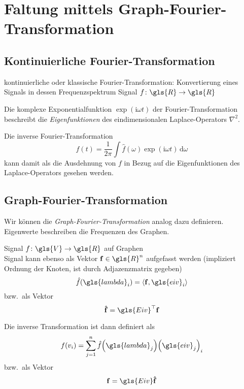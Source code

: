\section{Faltung mittels Graph-Fourier-Transformation}

\subsection{Kontinuierliche Fourier-Transformation}

kontinuierliche oder klassische Fourier-Transformation:
Konvertierung eines Signals in dessen Frequenzspektrum
Signal $f \colon \gls{R} \to \gls{R}$

Die komplexe Exponentialfunktion $\exp\left(\mathrm{i}\omega t\right)$ der Fourier-Transformation beschreibt die \emph{Eigenfunktionen} des eindimensionalen Laplace-Operators $\nabla^2$.

Die inverse Fourier-Transformation
\begin{equation}
  f\left(t\right) = \frac{1}{2\pi} \int \hat f\left(\omega\right) \exp\left(\mathrm{i}\omega t\right)\,\mathrm{d}\omega
\end{equation}
kann damit als die Ausdehnung von $f$ in Bezug auf die Eigenfunktionen des Laplace-Operators gesehen werden.

\subsection{Graph-Fourier-Transformation}

Wir können die \emph{Graph-Fourier-Transformation} analog dazu definieren.\\
Eigenwerte beschreiben die Frequenzen des Graphen.

Signal $f \colon \gls{V} \to \gls{R}$ auf Graphen\\
Signal kann ebenso als Vektor $\ve{f} \in \gls{R}^n$ aufgefasst werden (impliziert Ordnung der Knoten, ist durch Adjazenzmatrix gegeben)\\
\begin{equation}
  \hat f(\gls{lambda}_i) = \left\langle \ve{f}, \gls{eiv}_i \right\rangle
\end{equation}
bzw.\ als Vektor
\begin{equation}
  \ve{\hat f} = \gls{Eiv}^{\top} \ve{f}
\end{equation}

Die inverse Transformation ist dann definiert als
\begin{equation}
  f\left(v_i\right) = \sum_{j=1}^n \hat f\left(\gls{lambda}_j\right) {\left(\gls{eiv}_j\right)}_i
\end{equation}
bzw.\ als Vektor
\begin{equation}
  \ve{f} = \gls{Eiv}\ve{\hat f}
\end{equation}

